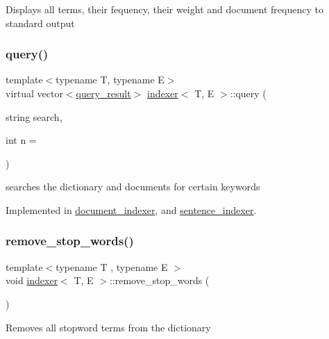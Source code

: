 Displays all terms, their fequency, their weight and document frequency to standard output \mbox{\label{classindexer_a9a7679edcc3114613dac13b688c0e4b2}} 
\subsubsection{\texorpdfstring{query()}{query()}}
{\footnotesize\ttfamily template$<$typename T, typename E$>$ \\
virtual vector$<$\hyperlink{classquery__result}{query\+\_\+result}$>$ \hyperlink{classindexer}{indexer}$<$ T, E $>$\+::query (\begin{DoxyParamCaption}\item[{string}]{search,  }\item[{int}]{n = {} }\end{DoxyParamCaption})\hspace{0.3cm}{\ttfamily [pure virtual]}}

searches the dictionary and documents for certain keywords 

Implemented in \hyperlink{classdocument__indexer_acdb8dcbe7827e775ab8d64e79212ea36}{document\+\_\+indexer}, and \hyperlink{classsentence__indexer_a039940ff3461bb8fa95b66aa9b5f8496}{sentence\+\_\+indexer}.

\mbox{\label{classindexer_aad6e8ddbe8103aa48965f3a4f7aea2c0}} 
\subsubsection{\texorpdfstring{remove\+\_\+stop\+\_\+words()}{remove\_stop\_words()}}
{\footnotesize\ttfamily template$<$typename T , typename E $>$ \\
void \hyperlink{classindexer}{indexer}$<$ T, E $>$\+::remove\+\_\+stop\+\_\+words (\begin{DoxyParamCaption}{ }\end{DoxyParamCaption})}

Removes all stopword terms from the dictionary \mbox{\label{classindexer_af54a50fbe5e93e780394d6fede3d2039}} 
